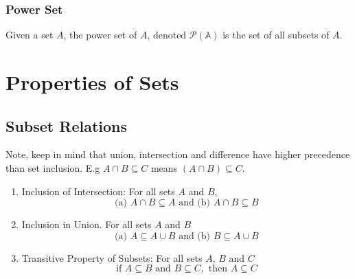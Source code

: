 \documentclass[11pt]{article}
\newcommand*\powerset{\mathcal{P} (\mathbb{A})}
\begin{document}
\subsubsection{Power Set}

\begin{definition}\label{def:power-set}
    Given a set $A$, the power set of $A$, denoted $\powerset$ is the set of all subsets of $A$.
\end{definition}



\section{Properties of Sets}

\subsection{Subset Relations}

\begin{definition}\label{def:subset-relations}
    Note, keep in mind that union, intersection and difference have higher precedence
    than set inclusion. E.g $A \cap B \subseteq C$ means $(A \cap B) \subseteq C$.

    \begin{enumerate}
        \item Inclusion of Intersection: For all sets $A$ and $B$,
            \begin{equation*}
                \text{(a) } A \cap B \subseteq A \text{ and (b) } A \cap B \subseteq B
            \end{equation*}
        \item Inclusion in Union. For all sets $A$ and $B$
            \begin{equation*}
                \text{(a) } A \subseteq A \cup B \text{ and (b) } B \subseteq A \cup B
            \end{equation*}
        \item Transitive Property of Subsets: For all sets $A$, $B$ and $C$
            \begin{equation*}
                \text{if } A \subseteq B \text{ and } B \subseteq C, \text{ then } A \subseteq C
            \end{equation*}
    \end{enumerate}
\end{definition}
\end{document}

